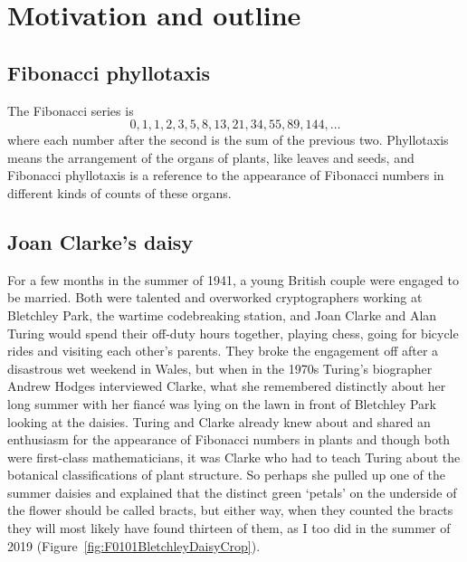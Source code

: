 
\chapter{Motivation and outline}
\section{Fibonacci phyllotaxis}
The Fibonacci series is
\[
0, 1, 1, 2, 3, 5,8, 13, 21, 34, 55, 89, 144, \dots
\] where each number after the second is the sum of the previous two. Phyllotaxis means the arrangement of the organs of plants, like leaves and seeds,  and Fibonacci phyllotaxis is a reference to the appearance of Fibonacci numbers in different kinds of counts of these organs. 
 
\section{Joan Clarke's daisy}

%
 For a few months in the summer of 1941, a young British couple were engaged to be married. Both were talented and overworked cryptographers working at Bletchley Park, the wartime codebreaking station, and  
 Joan Clarke and Alan Turing would spend their off-duty hours together, playing chess,  going for bicycle rides and visiting each other's parents. They broke the engagement off after a disastrous wet weekend in Wales, but when in the 1970s Turing's biographer Andrew Hodges interviewed Clarke, what she remembered distinctly about her long summer with her fianc\'e was lying on the lawn in front of Bletchley Park looking at the daisies. Turing and Clarke already knew about and shared an enthusiasm for the appearance of Fibonacci numbers in plants and though both were first-class mathematicians, it was Clarke who had to teach Turing about the botanical classifications of plant structure. So perhaps she  pulled up one of the summer daisies and explained that the distinct green `petals' on the underside of the flower should be called bracts, but either way, when they counted the bracts they will  most likely have found thirteen of them, as I too did in the summer of 2019 (Figure~\ref{fig:F0101BletchleyDaisyCrop}).

